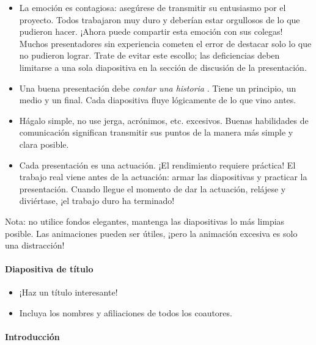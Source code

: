 \documentclass[
]{article}
\providecommand{\tightlist}{%
  \setlength{\itemsep}{0pt}\setlength{\parskip}{0pt}}
\begin{document}
\begin{itemize}
\item
  La emoción es contagiosa: asegúrese de transmitir su entusiasmo por el
  proyecto. Todos trabajaron muy duro y deberían estar orgullosos de lo
  que pudieron hacer. ¡Ahora puede compartir esta emoción con sus
  colegas! Muchos presentadores sin experiencia cometen el error de
  destacar solo lo que no pudieron lograr. Trate de evitar este escollo;
  las deficiencias deben limitarse a una sola diapositiva en la sección
  de discusión de la presentación.
\item
  Una buena presentación debe \emph{contar una historia }. Tiene un
  principio, un medio y un final. Cada diapositiva fluye lógicamente de
  lo que vino antes.
\item
  Hágalo simple, no use jerga, acrónimos, etc. excesivos. Buenas
  habilidades de comunicación significan transmitir sus puntos de la
  manera más simple y clara posible.
\item
  Cada presentación es una actuación. ¡El rendimiento requiere práctica!
  El trabajo real viene antes de la actuación: armar las diapositivas y
  practicar la presentación. Cuando llegue el momento de dar la
  actuación, relájese y diviértase, ¡el trabajo duro ha terminado!
\end{itemize}

Nota: no utilice fondos elegantes, mantenga las diapositivas lo más
limpias posible. Las animaciones pueden ser útiles, ¡pero la animación
excesiva es solo una distracción!

\hypertarget{diapositiva-de-tuxedtulo}{%
\paragraph{Diapositiva de título}\label{diapositiva-de-tuxedtulo}}

\begin{itemize}
\tightlist
\item
  ¡Haz un título interesante!
\item
  Incluya los nombres y afiliaciones de todos los coautores.
\end{itemize}

\hypertarget{introducciuxf3n-1}{%
\paragraph{Introducción}\label{introducciuxf3n-1}}
\end{document}
